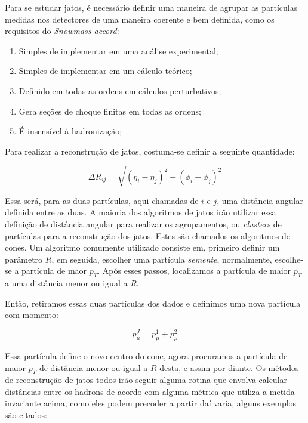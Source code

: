 Para se estudar jatos, é necessário definir uma maneira de agrupar as partículas medidas nos detectores 
de uma maneira coerente e bem definida, como os requisitos do \emph{Snowmass accord}:

\begin{enumerate}
 \item Simples de implementar em uma análise experimental;
 \item Simples de implementar em um cálculo teórico;
 \item Definido em todas as ordens em cálculos perturbativos;
 \item Gera seções de choque finitas em todas as ordens;
 \item É insensível à hadronização;
\end{enumerate}

Para realizar a reconstrução de jatos\cite{salam_towards_2010}, costuma-se definir a seguinte quantidade:

\begin{equation}
 \Delta R_{ij} = \sqrt{(\eta_i-\eta_j)^2+(\phi_i-\phi_j)^2}
\end{equation}

Essa será, para as duas partículas, aqui chamadas de $i$ e $j$, uma distância angular
definida entre as duas. A maioria dos algoritmos de jatos irão utilizar essa definição de distância angular para realizar os agrupamentos,
ou {\it clusters} de partículas para a reconstrução dos jatos. Estes são chamados os algoritmos de cones. Um algoritmo
comumente utilizado consiste em, primeiro definir um parâmetro $R$, em seguida, escolher uma partícula {\it semente}, normalmente, escolhe-se
a partícula de maor $p_T$. Após esses passos, localizamos a partícula de maior $p_T$ a uma distância menor ou igual a $R$.
\par
Então, retiramos essas duas partículas dos dados e definimos uma nova partícula com momento:

\begin{equation}
 p_{\mu}^{J} = p_{\mu}^1 + p_{\mu}^2
\end{equation}

Essa partícula define o novo centro do cone, agora procuramos a partícula de maior $p_T$ de distância menor ou igual a $R$ desta, e assim por
diante. Os métodos de reconstrução de jatos todos irão seguir alguma rotina que envolva calcular distâncias entre os hadrons de acordo com
alguma métrica que utiliza a metida invariante acima, como eles podem precoder a partir daí varia, alguns exemplos são citados:

